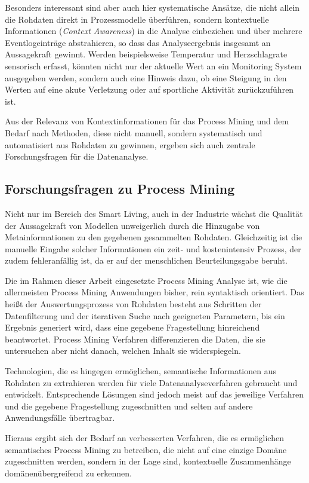 Besonders interessant sind aber auch hier systematische Ansätze, die nicht allein die Rohdaten direkt in Prozessmodelle überführen, sondern kontextuelle Informationen (\textit{Context Awareness}) in die Analyse einbeziehen und über mehrere Eventlogeinträge abstrahieren, so dass das Analyseergebnis insgesamt an Aussagekraft gewinnt.
Werden beispielsweise Temperatur und Herzschlagrate sensorisch erfasst, könnten nicht nur der aktuelle Wert an ein Monitoring System ausgegeben werden, sondern auch eine Hinweis dazu, ob eine Steigung in den Werten auf eine akute Verletzung oder auf sportliche Aktivität zurückzuführen ist.

Aus der Relevanz von Kontextinformationen für das Process Mining und dem Bedarf nach Methoden, diese nicht manuell, sondern systematisch und automatisiert aus Rohdaten zu gewinnen, ergeben sich auch zentrale Forschungsfragen für die Datenanalyse.

\subsection{Forschungsfragen zu Process Mining}
Nicht nur im Bereich des Smart Living, auch in der Industrie wächst die Qualität der Aussagekraft von Modellen unweigerlich durch die Hinzugabe von Metainformationen zu den gegebenen gesammelten Rohdaten. Gleichzeitig ist die manuelle Eingabe solcher Informationen ein zeit- und kostenintensiv Prozess, der zudem fehleranfällig ist, da er auf der menschlichen Beurteilungsgabe beruht.

Die im Rahmen dieser Arbeit eingesetzte Process Mining Analyse ist, wie die allermeisten Process Mining Anwendungen bisher, rein syntaktisch orientiert. Das heißt der Auswertungsprozess von Rohdaten besteht aus Schritten der Datenfilterung und der iterativen Suche nach geeigneten Parametern, bis ein Ergebnis generiert wird, dass eine gegebene Fragestellung hinreichend beantwortet. Process Mining Verfahren differenzieren die Daten, die sie untersuchen aber nicht danach, welchen Inhalt sie widerspiegeln. 

Technologien, die es hingegen ermöglichen, semantische Informationen aus Rohdaten zu extrahieren werden für viele Datenanalyseverfahren gebraucht und entwickelt. Entsprechende Lösungen sind jedoch meist auf das jeweilige Verfahren und die gegebene Fragestellung zugeschnitten und selten auf andere Anwendungsfälle übertragbar. 

Hieraus ergibt sich der Bedarf an verbesserten Verfahren, die es ermöglichen semantisches Process Mining zu betreiben, die nicht auf eine einzige Domäne zugeschnitten werden, sondern in der Lage sind, kontextuelle Zusammenhänge domänenübergreifend zu erkennen.

